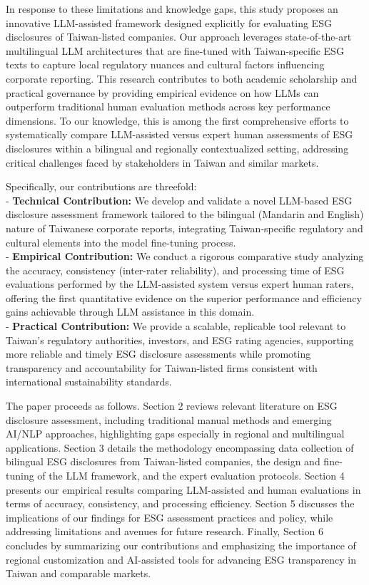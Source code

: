 \documentclass[
  12pt,
]{article}
\begin{document}
In response to these limitations and knowledge gaps, this study proposes
an innovative LLM-assisted framework designed explicitly for evaluating
ESG disclosures of Taiwan-listed companies. Our approach leverages
state-of-the-art multilingual LLM architectures that are fine-tuned with
Taiwan-specific ESG texts to capture local regulatory nuances and
cultural factors influencing corporate reporting. This research
contributes to both academic scholarship and practical governance by
providing empirical evidence on how LLMs can outperform traditional
human evaluation methods across key performance dimensions. To our
knowledge, this is among the first comprehensive efforts to
systematically compare LLM-assisted versus expert human assessments of
ESG disclosures within a bilingual and regionally contextualized
setting, addressing critical challenges faced by stakeholders in Taiwan
and similar markets.

Specifically, our contributions are threefold:\\
- \textbf{Technical Contribution:} We develop and validate a novel
LLM-based ESG disclosure assessment framework tailored to the bilingual
(Mandarin and English) nature of Taiwanese corporate reports,
integrating Taiwan-specific regulatory and cultural elements into the
model fine-tuning process.\\
- \textbf{Empirical Contribution:} We conduct a rigorous comparative
study analyzing the accuracy, consistency (inter-rater reliability), and
processing time of ESG evaluations performed by the LLM-assisted system
versus expert human raters, offering the first quantitative evidence on
the superior performance and efficiency gains achievable through LLM
assistance in this domain.\\
- \textbf{Practical Contribution:} We provide a scalable, replicable
tool relevant to Taiwan's regulatory authorities, investors, and ESG
rating agencies, supporting more reliable and timely ESG disclosure
assessments while promoting transparency and accountability for
Taiwan-listed firms consistent with international sustainability
standards.

The paper proceeds as follows. Section 2 reviews relevant literature on
ESG disclosure assessment, including traditional manual methods and
emerging AI/NLP approaches, highlighting gaps especially in regional and
multilingual applications. Section 3 details the methodology
encompassing data collection of bilingual ESG disclosures from
Taiwan-listed companies, the design and fine-tuning of the LLM
framework, and the expert evaluation protocols. Section 4 presents our
empirical results comparing LLM-assisted and human evaluations in terms
of accuracy, consistency, and processing efficiency. Section 5 discusses
the implications of our findings for ESG assessment practices and
policy, while addressing limitations and avenues for future research.
Finally, Section 6 concludes by summarizing our contributions and
emphasizing the importance of regional customization and AI-assisted
tools for advancing ESG transparency in Taiwan and comparable markets.
\end{document}
